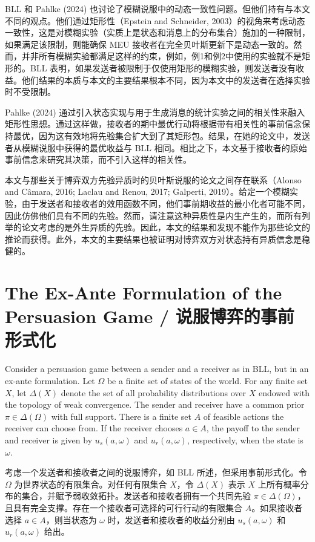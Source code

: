 \documentclass[12pt,a4paper]{article}
\theoremstyle{definition}
\theoremstyle{remark}
\newenvironment{original}{%
    \par\medskip\noindent%
    \begin{tcolorbox}[%
        colback=white,%
        colframe=black!50,%
        title=\textbf{Original English},%
        fonttitle=\small\bfseries,%
        left=0pt, right=0pt, top=2pt, bottom=2pt,%
        boxrule=0.5pt,%
        arc=0pt,%
        outer arc=0pt%
    ]%
    \small%
}{%
    \end{tcolorbox}%
}
\newenvironment{translation}{%
    \par\smallskip\noindent%
    \begin{tcolorbox}[%
        colback=blue!3!white,%
        colframe=blue!40!black,%
        title=\textbf{中文翻译},%
        fonttitle=\small\bfseries,%
        left=0pt, right=0pt, top=2pt, bottom=2pt,%
        boxrule=0.5pt,%
        arc=0pt,%
        outer arc=0pt%
    ]%
    \small\color{blue!60!black}%
}{%
    \end{tcolorbox}\medskip%
}
\begin{document}
\begin{translation}
BLL 和 Pahlke (2024) 也讨论了模糊说服中的动态一致性问题。但他们持有与本文不同的观点。他们通过矩形性（Epstein and Schneider, 2003）的视角来考虑动态一致性，这是对模糊实验（实质上是状态和消息上的分布集合）施加的一种限制，如果满足该限制，则能确保 MEU 接收者在完全贝叶斯更新下是动态一致的。然而，并非所有模糊实验都满足这样的约束，例如，例1和例2中使用的实验就不是矩形的。BLL 表明，如果发送者被限制于仅使用矩形的模糊实验，则发送者没有收益。他们结果的本质与本文的主要结果根本不同，因为本文中的发送者在选择实验时不受限制。

Pahlke (2024) 通过引入状态实现与用于生成消息的统计实验之间的相关性来融入矩形性思想。通过这样做，接收者的期中最优行动将根据带有相关性的事前信念保持最优，因为这有效地将先验集合扩大到了其矩形包。结果，在她的论文中，发送者从模糊说服中获得的最优收益与 BLL 相同。相比之下，本文基于接收者的原始事前信念来研究其决策，而不引入这样的相关性。

本文与那些关于博弈双方先验异质时的贝叶斯说服的论文之间存在联系（Alonso and C\^{a}mara, 2016; Laclau and Renou, 2017; Galperti, 2019）。给定一个模糊实验，由于发送者和接收者的效用函数不同，他们事前期收益的最小化者可能不同，因此仿佛他们具有不同的先验。然而，请注意这种异质性是内生产生的，而所有列举的论文考虑的是外生异质的先验。因此，本文的结果和发现不能作为那些论文的推论而获得。此外，本文的主要结果也被证明对博弈双方对状态持有异质信念是稳健的。
\end{translation}

\section{The Ex-Ante Formulation of the Persuasion Game / 说服博弈的事前形式化}

\begin{original}
Consider a persuasion game between a sender and a receiver as in BLL, but in an ex-ante formulation. Let $\Omega$ be a finite set of states of the world. For any finite set $X$, let $\Delta(X)$ denote the set of all probability distributions over $X$ endowed with the topology of weak convergence. The sender and receiver have a common prior $\pi \in \Delta(\Omega)$ with full support. There is a finite set $A$ of feasible actions the receiver can choose from. If the receiver chooses $a \in A$, the payoff to the sender and receiver is given by $u_s(a, \omega)$ and $u_r(a, \omega)$, respectively, when the state is $\omega$.
\end{original}
\begin{translation}
考虑一个发送者和接收者之间的说服博弈，如 BLL 所述，但采用事前形式化。令 $\Omega$ 为世界状态的有限集合。对任何有限集合 $X$，令 $\Delta(X)$ 表示 $X$ 上所有概率分布的集合，并赋予弱收敛拓扑。发送者和接收者拥有一个共同先验 $\pi \in \Delta(\Omega)$，且具有完全支撑。存在一个接收者可选择的可行行动的有限集合 $A$。如果接收者选择 $a \in A$，则当状态为 $\omega$ 时，发送者和接收者的收益分别由 $u_s(a, \omega)$ 和 $u_r(a, \omega)$ 给出。
\end{translation}
\end{document}
